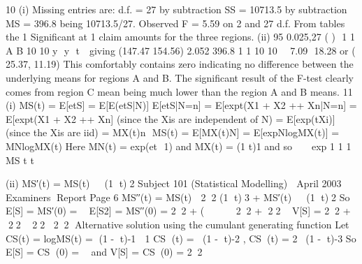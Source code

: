 10 (i) Missing entries are:
d.f. = 27 by subtraction
SS = 10713.5 by subtraction
MS = 396.8 being 10713.5/27.
Observed F = 5.59 on 2 and 27 d.f.
From tables the 1%
Significant at 1%
claim amounts for the three regions.
(ii) 95%
0.025,27
( )  1 1
A B 10 10 y  y  t  
giving
(147.47 154.56) 2.052 396.8 1 1
10 10
  
	7.09  18.28 or (	25.37, 11.19)
This comfortably contains zero indicating no difference between the
underlying means for regions A and B.
The significant result of the F-test clearly comes from region C mean being
much lower than the region A and B means.
11 (i) MS(t) = E[etS] = E[E(etS|N)]
E[etS|N=n] = E[exp{t(X1 + X2 ++ Xn}|N=n]
= E[exp{t(X1 + X2 ++ Xn}] (since the Xis are independent of N)
= 
 E[exp(tXi)] (since the Xis are iid)
= {MX(t)}n
 MS(t) = E[{MX(t)}N] = E[exp{NlogMX(t)}] = MN{logMX(t)}
Here MN(t) = exp{(et  1)} and MX(t) = (1 	t)1 and so
     exp 1 1 1 MS t t       	 

(ii) MS′(t) = MS(t)  (1 	 t)2
Subject 101 (Statistical Modelling)  April 2003  Examiners Report
Page 6
MS′′(t) = MS(t)  22 (1 	 t)3 + MS′(t)  (1 	 t)2
So E[S] = MS′(0) = 
E[S2] = MS′′(0) = 22 + (  
22 + 22
V[S] = 22 + 22	22
22
Alternative solution using the cumulant generating function
Let CS(t) = logMS(t) = {(1 - t)-1  1}
CS (t) = (1 - t)-2 , CS(t) = 2(1 - t)-3
So E[S] = CS (0) =  and V[S] = CS(0) = 22
